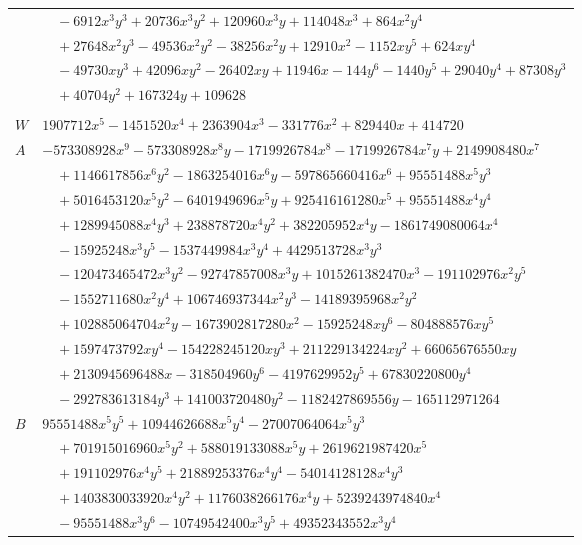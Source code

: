 \documentclass[11pt]{article}
\begin{document}
\begin{longtable}{@{}ll@{}}
 & $\quad -6912x^{3}y^{3}+20736x^{3}y^{2}+120960x^{3}y+114048x^{3}+864x^{2}y^{4}$\\
 & $\quad +27648x^{2}y^{3}-49536x^{2}y^{2}-38256x^{2}y+12910x^{2}-1152xy^{5}+624xy^{4}$\\
 & $\quad -49730xy^{3}+42096xy^{2}-26402xy+11946x-144y^{6}-1440y^{5}+29040y^{4}+87308y^{3}$\\
 & $\quad +40704y^{2}+167324y+109628$\\
\addlinespace[3pt]
\multicolumn{2}{@{}l}{$i=33$, $m=20736$, neighbours $116,6,30,44,57,69,72,92$}\\
$W$ & $1907712x^{5}-1451520x^{4}+2363904x^{3}-331776x^{2}+829440x+414720$\\
$A$ & $-573308928x^{9}-573308928x^{8}y-1719926784x^{8}-1719926784x^{7}y+2149908480x^{7}$\\
 & $\quad +1146617856x^{6}y^{2}-1863254016x^{6}y-597865660416x^{6}+95551488x^{5}y^{3}$\\
 & $\quad +5016453120x^{5}y^{2}-6401949696x^{5}y+925416161280x^{5}+95551488x^{4}y^{4}$\\
 & $\quad +1289945088x^{4}y^{3}+238878720x^{4}y^{2}+382205952x^{4}y-1861749080064x^{4}$\\
 & $\quad -15925248x^{3}y^{5}-1537449984x^{3}y^{4}+4429513728x^{3}y^{3}$\\
 & $\quad -120473465472x^{3}y^{2}-92747857008x^{3}y+1015261382470x^{3}-191102976x^{2}y^{5}$\\
 & $\quad -1552711680x^{2}y^{4}+106746937344x^{2}y^{3}-14189395968x^{2}y^{2}$\\
 & $\quad +102885064704x^{2}y-1673902817280x^{2}-15925248xy^{6}-804888576xy^{5}$\\
 & $\quad +1597473792xy^{4}-154228245120xy^{3}+211229134224xy^{2}+66065676550xy$\\
 & $\quad +2130945696488x-318504960y^{6}-4197629952y^{5}+67830220800y^{4}$\\
 & $\quad -292783613184y^{3}+141003720480y^{2}-1182427869556y-165112971264$\\
$B$ & $95551488x^{5}y^{5}+10944626688x^{5}y^{4}-27007064064x^{5}y^{3}$\\
 & $\quad +701915016960x^{5}y^{2}+588019133088x^{5}y+2619621987420x^{5}$\\
 & $\quad +191102976x^{4}y^{5}+21889253376x^{4}y^{4}-54014128128x^{4}y^{3}$\\
 & $\quad +1403830033920x^{4}y^{2}+1176038266176x^{4}y+5239243974840x^{4}$\\
 & $\quad -95551488x^{3}y^{6}-10749542400x^{3}y^{5}+49352343552x^{3}y^{4}$\\

\end{longtable}
\end{document}
